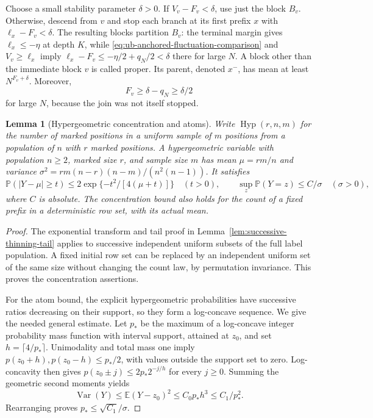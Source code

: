 \documentclass[11pt]{article}
\numberwithin{equation}{section}
\newtheorem{lemma}[lemma]{Lemma}
\newcommand{\E}{\mathbb E}
\newcommand{\Pp}{\mathbb P}
\newcommand{\Var}{\operatorname{Var}}
\newcommand{\1}{\mathbf 1}
\begin{document}
Choose a small stability parameter $\delta>0$. If $V_v-F_v<\delta$,
use just the block $B_v$. Otherwise, descend from $v$ and stop each
branch at its first prefix $x$ with $\ell_x-F_v<\delta$.
The resulting blocks partition $B_v$: the terminal margin gives
$\ell_x\le-\eta$ at depth $K$, while
\eqref{eq:ub-anchored-fluctuation-comparison} and $V_v\ge\ell_x$ imply
$\ell_x-F_v\le-\eta/2+q_N/2<\delta$ there for large $N$.
A block other than the immediate block $v$ is called proper. Its parent, denoted $x^-$,
has mean at least $N^{F_v+\delta}$. Moreover,
\begin{equation}
\label{eq:ub-proper-fluctuation-lower}
 F_v\ge\delta-q_N\ge\delta/2
\end{equation}
for large $N$, because the join was not itself stopped.

\begin{lemma}[Hypergeometric concentration and atoms]
\label{lem:ub-hypergeometric-estimates}
Write $\operatorname{Hyp}(r,n,m)$ for the number of marked positions
in a uniform sample of $m$ positions from a population of $n$ with
$r$ marked positions. A hypergeometric variable with population $n\ge2$, marked size $r$,
and sample size $m$ has mean $\mu=rm/n$ and variance
$\sigma^2=rm(n-r)(n-m)/(n^2(n-1))$. It satisfies
\[
 \Pp(|Y-\mu|\ge t)\le2\exp\{-t^2/[4(\mu+t)]\}\quad(t>0),
 \qquad \sup_z\Pp(Y=z)\le C/\sigma\quad(\sigma>0),
\]
where $C$ is absolute. The concentration bound also holds for the count
of a fixed prefix in a deterministic row set, with its actual mean.
\end{lemma}

\begin{proof}
The exponential transform and tail proof in
Lemma~\ref{lem:successive-thinning-tail} applies to successive independent
uniform subsets of the full label population. A fixed initial row set
can be replaced by an independent uniform set of the same size without
changing the count law, by permutation invariance. This proves the
concentration assertions.

For the atom bound, the explicit hypergeometric probabilities have
successive ratios decreasing on their support, so they form a
log-concave sequence. We give the needed general estimate. Let $p_*$
be the maximum of a log-concave integer probability mass function
with interval support,
attained at $z_0$, and set $h=\lceil4/p_*\rceil$. Unimodality and total
mass one imply $p(z_0+h),p(z_0-h)\le p_*/2$, with values outside the
support set to zero. Log-concavity then gives
$p(z_0\pm j)\le2p_*2^{-j/h}$ for every $j\ge0$. Summing the geometric
second moments yields
\[
 \Var(Y)\le\E(Y-z_0)^2\le C_0p_*h^3\le C_1/p_*^2.
\]
Rearranging proves $p_*\le\sqrt{C_1}/\sigma$.
\end{proof}
\end{document}
